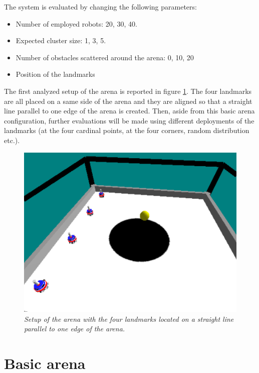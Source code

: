 \noindent
The system is evaluated by changing the following parameters:

\begin{itemize}

  \item Number of employed robots: 20, 30, 40.
  \item Expected cluster size: 1, 3, 5.
  \item Number of obstacles scattered around the arena: 0, 10, 20
  \item Position of the landmarks 

\end{itemize}  

The first analyzed setup of the arena is reported in figure \ref{fig:arena}. The four landmarks are all placed on a same side of the arena and they are aligned so that a straight line parallel to one edge of the arena is created. Then, aside from this basic arena configuration, further evaluations will be made using different deployments of the landmarks (at the four cardinal points, at the four corners, random distribution etc.).  

\begin{figure}[H]
\centering
\includegraphics[width=\linewidth]{images/arena.png}
\caption{\textit{Setup of the arena with the four landmarks located on a straight line parallel to one edge of the arena.}}
\label{fig:arena}
\end{figure}

\section{Basic arena}

